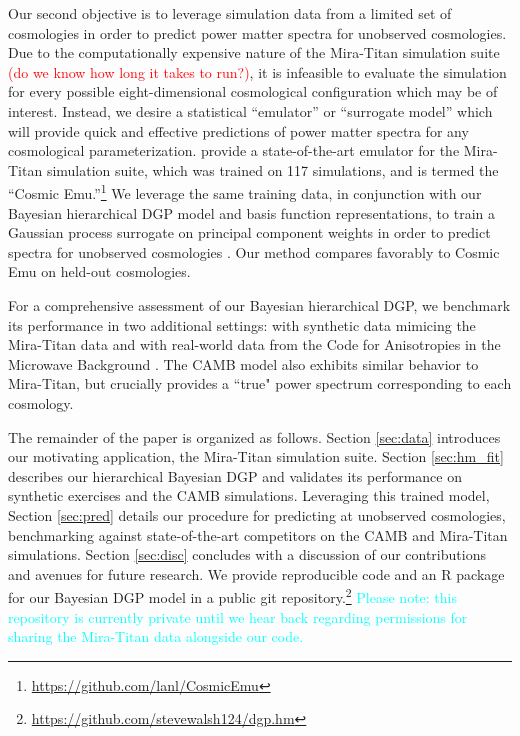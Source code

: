 \documentclass[11pt]{article}
\begin{document}
Our second objective is to leverage simulation data from a limited set of
cosmologies in order to predict power matter spectra for unobserved cosmologies.
Due to the computationally expensive nature of the Mira-Titan simulation suite
\textcolor{red}{(do we know how long it takes to run?)},
it is infeasible to evaluate the simulation for every possible eight-dimensional
cosmological configuration which may be of interest.  Instead, we desire
a statistical ``emulator'' or ``surrogate model'' 
\citep{santner2003design,gramacy2020surrogates} which will provide quick and effective
predictions of power matter spectra for any cosmological parameterization.
\citet{moran2023mira} provide a state-of-the-art emulator for the Mira-Titan
simulation suite, which was trained on 117 simulations, and is termed 
the ``Cosmic Emu.''\footnote{\url{https://github.com/lanl/CosmicEmu}}
We leverage the same training data, in conjunction with our Bayesian hierarchical
DGP model and basis function representations, to train a Gaussian process surrogate 
on principal component weights in order to predict spectra for unobserved
cosmologies \citep{higdon2008computer, higdon2010estcosmo}. 
Our method compares favorably to Cosmic Emu on held-out cosmologies.

For a comprehensive assessment of our Bayesian hierarchical DGP, we benchmark
its performance in two additional settings: with synthetic data mimicing 
the Mira-Titan data and with real-world data from 
the Code for Anisotropies in the Microwave Background \citep[CAMB,][]{lewis2011CAMB}.
The CAMB model also exhibits similar behavior to Mira-Titan, but crucially
provides a ``true" power spectrum corresponding to each cosmology. 

The remainder of the paper is organized as follows.  Section \ref{sec:data} 
introduces our motivating application, the Mira-Titan simulation suite.  
Section \ref{sec:hm_fit} describes our hierarchical Bayesian DGP and 
validates its performance on synthetic exercises and the CAMB simulations.  
Leveraging this trained model, Section \ref{sec:pred} details 
our procedure for predicting at unobserved cosmologies, benchmarking against
state-of-the-art competitors on the CAMB and Mira-Titan simulations. 
Section \ref{sec:disc} concludes with a discussion of our contributions and avenues for 
future research.  We provide reproducible code and an {\sf R} package for our 
Bayesian DGP model in a public git repository.\footnote{\url{https://github.com/stevewalsh124/dgp.hm}}
\textcolor{cyan}{Please note: this repository is currently private until we 
hear back regarding permissions for sharing the Mira-Titan data alongside our code.}
\end{document}
